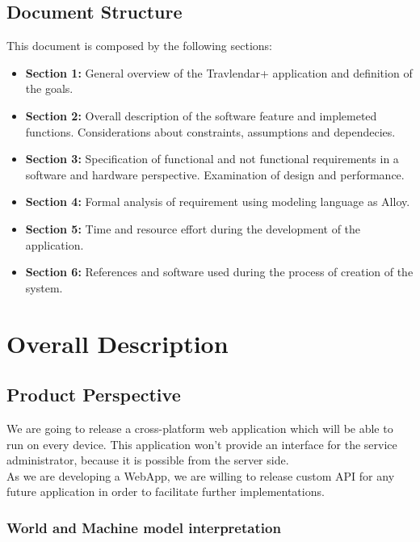 \documentclass[numbers=noenddot, 12pt, a4paper, oneside]{scrbook}
\begin{document}
\section{Document Structure}

This document is composed by the following sections:

\begin{itemize}
	\item \textbf{Section 1:} General overview of the Travlendar+ application and definition of the goals.
	\item \textbf{Section 2:} Overall description of the software feature and implemeted functions. Considerations about constraints, assumptions and dependecies.
	\item \textbf{Section 3:} Specification of functional and not functional requirements in a software and hardware perspective. Examination of design and performance.
	\item \textbf{Section 4:} Formal analysis of requirement using modeling language as Alloy.
	\item \textbf{Section 5:} Time and resource effort during the development of the application.
	\item \textbf{Section 6:} References and software used during the process of creation of the system. 
\end{itemize}


\chapter{Overall Description}

\section{Product Perspective}

We are going to release a cross-platform web application which will be able to run on every device. This application won't provide an interface for the service administrator, because it is possible from the server side.\\

As we are developing a WebApp, we are willing to release custom API for any future application in order to facilitate further implementations.\\

\subsection*{World and Machine model interpretation}
\end{document}
